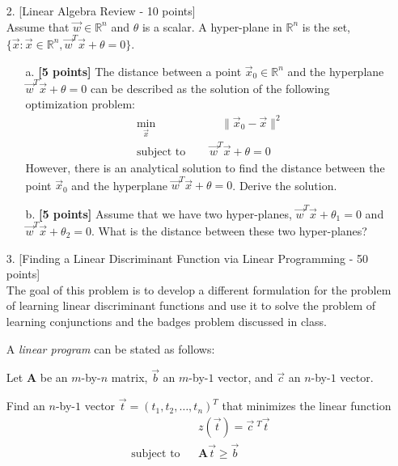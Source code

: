 \begin{enumerate}
\begin{enumerate}
\end{enumerate}

\item[2.] [Linear Algebra Review - 10 points] \\
	Assume that $\vec{w}\in \mathbb{R}^n$ and $\theta$
    is a scalar. A hyper-plane in $\mathbb{R}^n$ is the set, $
    \{ \vec{x}: \vec{x} \in \mathbb{R}^n, \vec{w}^T \vec{x} + \theta = 0 \}$.
	\begin{enumerate}
	\item [a.] \textbf{[5 points]} The distance between a point $\vec{x}_0 \in
	\mathbb{R}^n$ and the hyperplane $\vec{w}^T \vec{x} + \theta = 0$
	can be described as the solution of the following optimization problem:
	\begin{align*}
    	\min_{\vec{x}} & \qquad \| \vec{x}_0 - \vec{x} \|^2 \\
		\textrm{subject to } & \quad \vec{w}^T \vec{x} + \theta = 0
	\end{align*}
	However, there is an analytical solution to find the distance between
	the point $\vec{x}_0$ and the hyperplane $\vec{w}^T \vec{x} + \theta = 0$. 
	Derive the solution. 
	\item [b.]  \textbf{[5 points]} Assume that we have two hyper-planes,
	$\vec{w}^T \vec{x} + \theta_1 = 0$ and $\vec{w}^T \vec{x} + \theta_2 = 0$. 
	What is the distance between these two hyper-planes?
	\end{enumerate}

\item[3.] [Finding a Linear Discriminant Function via Linear Programming - 50 points] \\
The goal of this problem is to develop a different formulation for the problem
of learning linear discriminant functions and use it to solve the problem of
learning conjunctions and the badges problem
discussed in class.

\begin{definition}
A {\em linear program} can be stated as follows:

Let 
${\mathbf A}$ be an $m$-by-$n$ matrix,
$\vec{b}$ an $m$-by-$1$ vector, and
$\vec{c}$ an $n$-by-$1$ vector.

Find an $n$-by-$1$ vector $\vec{t} = (t_1, t_2,
\ldots, t_n)^T$ that minimizes the linear function
\begin{eqnarray*}
  & & z(\vec{t}) = \vec{c}~^T \vec{t} \\
\textrm{subject to} & & \mathbf{A} \vec{t} \geq \vec{b}
\end{eqnarray*}
\end{definition}


\end{enumerate}
